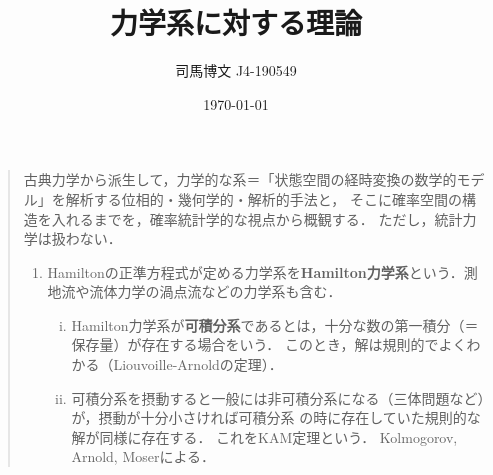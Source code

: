 \documentclass[uplatex, dvipdfmx]{jsreport}
\title{力学系に対する理論}
\author{司馬博文 J4-190549}
\date{\today}
\begin{document}
\tableofcontents

\begin{quotation}
    古典力学から派生して，力学的な系＝「状態空間の経時変換の数学的モデル」を解析する位相的・幾何学的・解析的手法と，
    そこに確率空間の構造を入れるまでを，確率統計学的な視点から概観する．
    ただし，統計力学は扱わない．
    \begin{enumerate}
        \item Hamiltonの正準方程式が定める力学系を\textbf{Hamilton力学系}という．測地流や流体力学の渦点流などの力学系も含む．
        \begin{enumerate}[(i)]
            \item Hamilton力学系が\textbf{可積分系}であるとは，十分な数の第一積分（＝保存量）が存在する場合をいう．
            このとき，解は規則的でよくわかる（Liouvoille-Arnoldの定理）．
            \item 可積分系を摂動すると一般には非可積分系になる（三体問題など）が，摂動が十分小さければ可積分系
            の時に存在していた規則的な解が同様に存在する．
            これをKAM定理という．
            Kolmogorov, Arnold, Moserによる．
        \end{enumerate}
    \end{enumerate}
\end{quotation}
\end{document}
